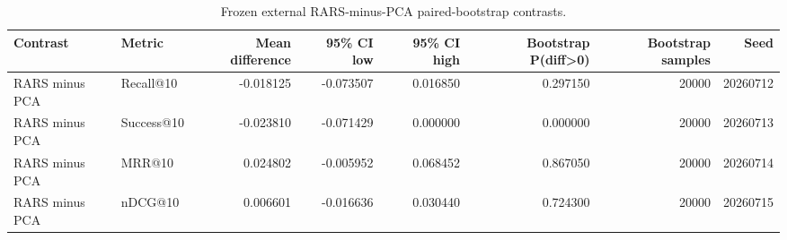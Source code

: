 \begin{table}[t]
\caption{Frozen external RARS-minus-PCA paired-bootstrap contrasts.}
\label{tab:rars-external-contrasts}
\begin{tabular}{llrrrrrr}
\toprule
Contrast & Metric & Mean difference & 95\% CI low & 95\% CI high & Bootstrap P(diff>0) & Bootstrap samples & Seed \\
\midrule
RARS minus PCA & Recall@10 & -0.018125 & -0.073507 & 0.016850 & 0.297150 & 20000 & 20260712 \\
RARS minus PCA & Success@10 & -0.023810 & -0.071429 & 0.000000 & 0.000000 & 20000 & 20260713 \\
RARS minus PCA & MRR@10 & 0.024802 & -0.005952 & 0.068452 & 0.867050 & 20000 & 20260714 \\
RARS minus PCA & nDCG@10 & 0.006601 & -0.016636 & 0.030440 & 0.724300 & 20000 & 20260715 \\
\bottomrule
\end{tabular}
\end{table}
